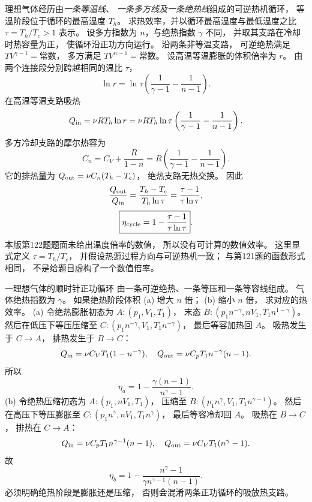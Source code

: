 理想气体经历由\emph{一条等温线、
一条多方线及一条绝热线}组成的可逆热机循环，
等温阶段位于循环的最高温度 $T_h$。
求热效率，并以循环最高温度与最低温度之比
$\tau=T_h/T_c>1$ 表示。
\exsolution
设多方指数为 $n$，与绝热指数 $\gamma$ 不同，
并取其支路在冷却时热容量为正，
使循环沿正功方向运行。
沿两条非等温支路，
可逆绝热满足
$TV^{\gamma-1}=\text{常数}$，
多方满足
$TV^{n-1}=\text{常数}$。
设高温等温膨胀的体积倍率为 $r$。
由两个连接段分别跨越相同的温比 $\tau$，
\[
\ln r=
\ln\tau\left(\frac1{\gamma-1}-\frac1{n-1}\right).
\]
在高温等温支路吸热
\[
Q_{\rm in}=\nu RT_h\ln r
=\nu RT_h\ln\tau
\left(\frac1{\gamma-1}-\frac1{n-1}\right).
\]
多方冷却支路的摩尔热容为
\[
C_n=C_V+\frac R{1-n}
=R\left(\frac1{\gamma-1}-\frac1{n-1}\right).
\]
它的排热量为
$Q_{\rm out}=\nu C_n(T_h-T_c)$，
绝热支路无热交换。
因此
\[
\frac{Q_{\rm out}}{Q_{\rm in}}
=\frac{T_h-T_c}{T_h\ln\tau}
=\frac{\tau-1}{\tau\ln\tau},
\]
\[
\boxed{\eta_{\rm cycle}
=1-\frac{\tau-1}{\tau\ln\tau}}.
\]
\excheck 本版第122题题面未给出温度倍率的数值，
所以没有可计算的数值效率。
这里显式定义 $\tau=T_h/T_c$，
并假设热源过程方向与可逆热机一致；
与第121题的函数形式相同，
不是给题目虚构了一个数值倍率。

一理想气体的顺时针正功循环
由一条可逆绝热、一条等压和一条等容线组成。
气体绝热指数为 $\gamma$。
如果绝热阶段体积
(a) 增大 $n$ 倍；
(b) 缩小 $n$ 倍，
求对应的热效率。
\exsolution
(a) 令绝热膨胀初态为
$A:(p_1,V_1,T_1)$，
末态
$B:(p_1n^{-\gamma},nV_1,T_1n^{1-\gamma})$。
然后在低压下等压压缩至
$C:(p_1n^{-\gamma},V_1,T_1n^{-\gamma})$，
最后等容加热回 $A$。
吸热发生于 $C\to A$，
排热发生于 $B\to C$：
\[
Q_{\rm in}=\nu C_VT_1(1-n^{-\gamma}),
\quad
Q_{\rm out}=\nu C_pT_1n^{-\gamma}(n-1).
\]
所以
\[
\boxed{\eta_a=
1-\frac{\gamma(n-1)}{n^\gamma-1}}.
\]
(b) 令绝热压缩初态为
$A:(p_1,nV_1,T_1)$，
压缩至
$B:(p_1n^\gamma,V_1,T_1n^{\gamma-1})$。
然后在高压下等压膨胀至
$C:(p_1n^\gamma,nV_1,T_1n^\gamma)$，
最后等容冷却回 $A$。
吸热在 $B\to C$，
排热在 $C\to A$：
\[
Q_{\rm in}=\nu C_pT_1n^{\gamma-1}(n-1),
\quad Q_{\rm out}=\nu C_VT_1(n^\gamma-1).
\]
故
\[
\boxed{\eta_b=
1-\frac{n^\gamma-1}
{\gamma n^{\gamma-1}(n-1)}}.
\]
\excheck 必须明确绝热阶段是膨胀还是压缩，
否则会混淆两条正功循环的吸放热支路。


